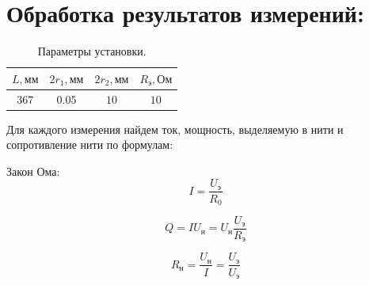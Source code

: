 \documentclass[a4paper,12pt]{article}
\begin{document}
\section{Обработка результатов измерений:}

\begin{table}[H]
  \begin{center}
    \begin{tabular}{|c|c|c|c|}
      \hline
      $L, \text{мм}$ & $2r_1, \text{мм}$ & $2r_2, \text{мм}$ & $R_{\text{э}}, \text{Ом}$
      \\\hline $367$ & $0.05$ & $10$ & $10$ \\\hline
    \end{tabular}
  \end{center}
  \caption{Параметры установки.\label{table:setup_pars}}
\end{table}

Для каждого измерения найдем ток, мощность, выделяемую в нити и сопротивление нити по формулам:

Закон Ома:
\begin{equation}
  I = \frac{U_{\text{э}}}{R_0}
\end{equation}

\begin{equation}
  Q = I U_{\text{н}} = U_{\text{н}} \frac{U_{\text{э}}}{R_{\text{э}}}
\end{equation}

\begin{equation}
  R_\text{н} = \frac{U_\text{н}}{I} = \frac{U_\text{э}}{U_\text{э}}
\end{equation}
\end{document}
